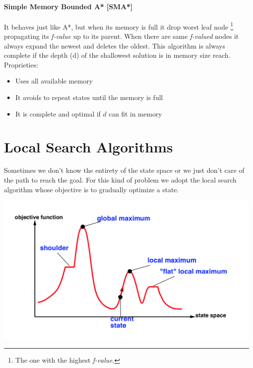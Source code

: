 \documentclass[10pt,a4paper]{article}
\begin{document}
\paragraph{Simple Memory Bounded A* [SMA*]}
It behaves just like A*, but when its memory is full it drop worst leaf node \footnote{The one with the highest \textit{f-value}.} propagating its \textit{f-value} up to its parent. When there are same \textit{f-valued} nodes it always expand the newest and deletes the oldest. This algorithm is always complete if the depth (d) of the shallowest solution is in memory size reach.\\
Proprieties:
\begin{itemize}
\item Uses all available memory
\item It avoids to repeat states until the memory is full
\item It is complete and optimal if $d$ can fit in memory
\end{itemize}


\newpage

\section{Local Search Algorithms}

Sometimes we don't know the entirety of the state space or we just don't care of the path to reach the goal. For this kind of problem we adopt the local search algorithm whose objective is to gradually optimize a state.

\includegraphics[scale=0.7]{images/problems.png}
\end{document}
